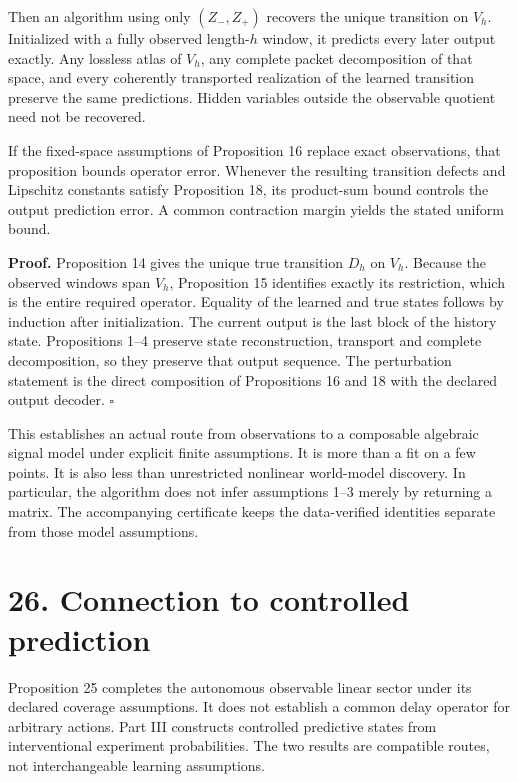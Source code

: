 \documentclass[11pt,letterpaper]{article}
\begin{document}
Then an algorithm using only \((Z_-,Z_+)\) recovers the unique
transition on \(V_h\). Initialized with a fully observed length-\(h\)
window, it predicts every later output exactly. Any lossless atlas of
\(V_h\), any complete packet decomposition of that space, and every
coherently transported realization of the learned transition preserve
the same predictions. Hidden variables outside the observable quotient
need not be recovered.

If the fixed-space assumptions of Proposition 16 replace exact
observations, that proposition bounds operator error. Whenever the
resulting transition defects and Lipschitz constants satisfy Proposition
18, its product-sum bound controls the output prediction error. A common
contraction margin yields the stated uniform bound.

\textbf{Proof.} Proposition 14 gives the unique true transition \(D_h\)
on \(V_h\). Because the observed windows span \(V_h\), Proposition 15
identifies exactly its restriction, which is the entire required
operator. Equality of the learned and true states follows by induction
after initialization. The current output is the last block of the
history state. Propositions 1--4 preserve state reconstruction,
transport and complete decomposition, so they preserve that output
sequence. The perturbation statement is the direct composition of
Propositions 16 and 18 with the declared output decoder. \(\square\)

This establishes an actual route from observations to a composable
algebraic signal model under explicit finite assumptions. It is more
than a fit on a few points. It is also less than unrestricted nonlinear
world-model discovery. In particular, the algorithm does not infer
assumptions 1--3 merely by returning a matrix. The accompanying
certificate keeps the data-verified identities separate from those model
assumptions.

\section{26. Connection to controlled
prediction}\label{connection-to-controlled-prediction}

Proposition 25 completes the autonomous observable linear sector under
its declared coverage assumptions. It does not establish a common delay
operator for arbitrary actions. Part III constructs controlled
predictive states from interventional experiment probabilities. The two
results are compatible routes, not interchangeable learning assumptions.
\end{document}
